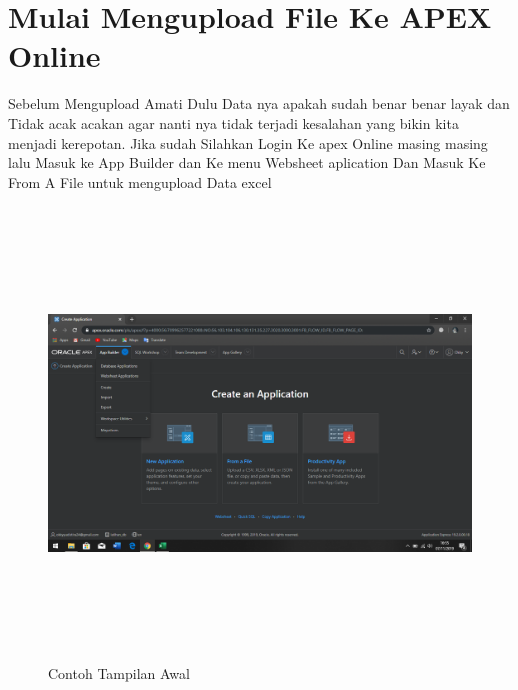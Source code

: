 \documentclass[a4, 13pt]{article}
\begin{document}
    \section{Mulai Mengupload File Ke APEX Online}
    Sebelum Mengupload Amati Dulu Data nya apakah sudah benar benar layak dan Tidak acak acakan agar nanti nya tidak terjadi kesalahan yang bikin kita menjadi kerepotan. Jika sudah Silahkan Login Ke apex Online masing masing lalu Masuk ke App Builder dan Ke menu Websheet aplication Dan Masuk Ke From A File untuk mengupload Data excel
    \begin{figure}[!htbp]
        \centering
        \includegraphics[width=16cm, height=12cm]{pictures/A.png}
        \caption{Contoh Tampilan Awal}
        \label{fig:my_label}
    \end{figure}
    \vspace{2cm}
    
\end{document}

